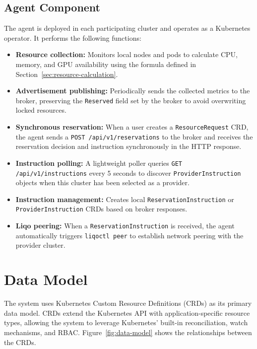 \subsection{Agent Component}
\label{subsec:agent-design}

The agent is deployed in each participating cluster and operates as a Kubernetes operator. It performs the following functions:

\begin{itemize}
    \item \textbf{Resource collection:} Monitors local nodes and pods to calculate CPU, memory, and GPU availability using the formula defined in Section~\ref{sec:resource-calculation}.
    \item \textbf{Advertisement publishing:} Periodically sends the collected metrics to the broker, preserving the \texttt{Reserved} field set by the broker to avoid overwriting locked resources.
    \item \textbf{Synchronous reservation:} When a user creates a \texttt{ResourceRequest} CRD, the agent sends a \texttt{POST /api/v1/reservations} to the broker and receives the reservation decision and instruction synchronously in the HTTP response.
    \item \textbf{Instruction polling:} A lightweight poller queries \texttt{GET /api/v1/instructions} every 5 seconds to discover \texttt{ProviderInstruction} objects when this cluster has been selected as a provider.
    \item \textbf{Instruction management:} Creates local \texttt{ReservationInstruction} or \texttt{ProviderInstruction} CRDs based on broker responses.
    \item \textbf{Liqo peering:} When a \texttt{ReservationInstruction} is received, the agent automatically triggers \texttt{liqoctl peer} to establish network peering with the provider cluster.
\end{itemize}


\section{Data Model}
\label{sec:data-model}

The system uses Kubernetes Custom Resource Definitions (CRDs) as its primary data model. CRDs extend the Kubernetes API with application-specific resource types, allowing the system to leverage Kubernetes' built-in reconciliation, watch mechanisms, and RBAC. Figure~\ref{fig:data-model} shows the relationships between the CRDs.

